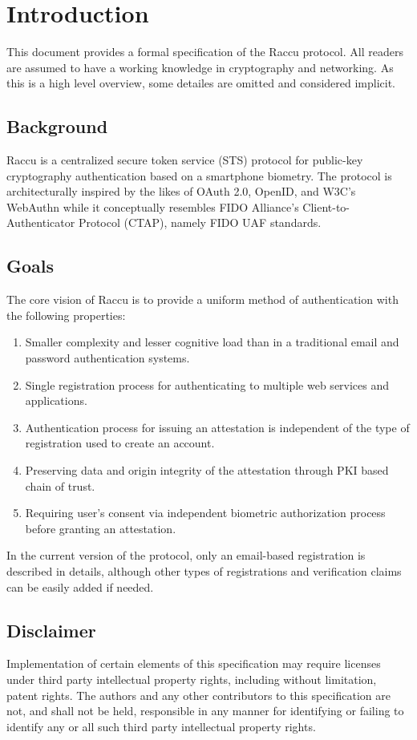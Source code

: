 \section{Introduction}
This document provides a formal specification of the Raccu protocol. All readers are assumed to have a working 
knowledge in cryptography and networking. As this is a high level overview, some detailes are omitted and
considered implicit.

    \subsection{Background}
    Raccu is a centralized secure token service (STS) protocol for public-key cryptography authentication 
    based on a smartphone biometry. The protocol is architecturally inspired by the likes of OAuth 2.0, OpenID, 
    and W3C's WebAuthn while it conceptually resembles FIDO Alliance's Client-to-Authenticator Protocol (CTAP), 
    namely FIDO UAF standards.

    \subsection{Goals}
    The core vision of Raccu is to provide a uniform method of authentication with the following properties: 
        \begin{enumerate}
            \item Smaller complexity and lesser cognitive load than in a traditional email and password 
                  authentication systems.
            \item Single registration process for authenticating to multiple web services and applications.
            \item Authentication process for issuing an attestation is independent of the type of registration 
                  used to create an account.
            \item Preserving data and origin integrity of the attestation through PKI based chain of trust.
            \item Requiring user's consent via independent biometric authorization process before granting an 
                  attestation.
        \end{enumerate}
    In the current version of the protocol, only an email-based registration is described in details, although 
    other types of registrations and verification claims can be easily added if needed.

    \subsection{Disclaimer}
    Implementation of certain elements of this specification may require licenses under third party intellectual 
    property rights, including without limitation, patent rights. The authors and any other contributors to this 
    specification are not, and shall not be held, responsible in any manner for identifying or failing to identify 
    any or all such third party intellectual property rights.    
    
